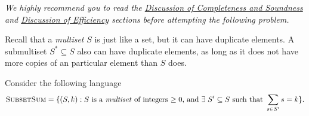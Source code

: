 \documentclass[11pt,addpoints,answers]{exam}
\begin{document}
\begin{questions}
    \emph{We highly recommend you to read the \href{https://eecs376.github.io/notes/complexity.html\#discussion-of-completeness-and-soundness}{Discussion of Completeness and Soundness} and \href{https://eecs376.github.io/notes/complexity.html\#discussion-of-efficiency}{Discussion of Efficiency} sections before attempting the following problem.}

    Recall that a \emph{multiset} $S$ is just like a set, but it can have duplicate elements. A submultiset $S^* \subseteq S$ also can have duplicate elements, as long as it does not have more copies of an particular element than $S$ does. 
    
    Consider the following language
    \newcommand{\SubsetSum}{\textsc{SubsetSum}}
    \[ 
        \SubsetSum = \set{(S, k) : S \text{ is a \emph{multiset} of integers $\geq 0$, and } \exists\; S' \subseteq S \text{ such that } \sum_{s \in S'} s = k}.
    \]

\end{questions}
\end{document}
